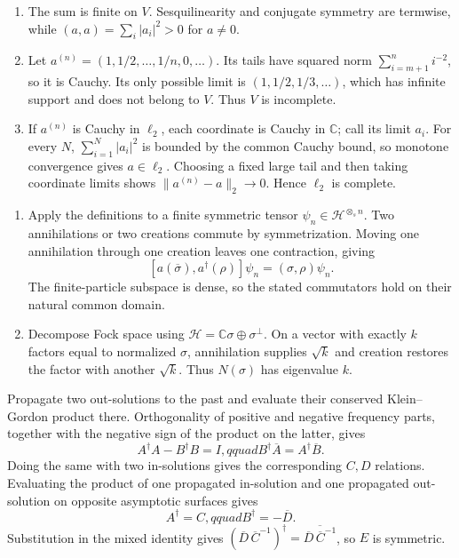 \ExerciseEditorialNote

\begin{enumerate}[leftmargin=2.8em,itemsep=1.2em]
\begin{enumerate}[label=\alph*),leftmargin=2em]
\item The sum is finite on \(V\).  Sesquilinearity and conjugate symmetry are
termwise, while \((a,a)=\sum_i|a_i|^2>0\) for \(a\ne0\).

\item Let \(a^{(n)}=(1,1/2,\ldots,1/n,0,\ldots)\).  Its tails have squared
norm \(\sum_{i=m+1}^n i^{-2}\), so it is Cauchy.  Its only possible limit is
\((1,1/2,1/3,\ldots)\), which has infinite support and does not belong to
\(V\).  Thus \(V\) is incomplete.

\item If \(a^{(n)}\) is Cauchy in \(\ell_2\), each coordinate is Cauchy in
\(\mathbb C\); call its limit \(a_i\).  For every \(N\),
\(\sum_{i=1}^N|a_i|^2\) is bounded by the common Cauchy bound, so monotone
convergence gives \(a\in\ell_2\).  Choosing a fixed large tail and then taking
coordinate limits shows \(\|a^{(n)}-a\|_2\to0\).  Hence \(\ell_2\) is complete.
\end{enumerate}

\begin{enumerate}[label=\alph*),leftmargin=2em]
\item Apply the definitions to a finite symmetric tensor
\(\psi_n\in\mathcal H^{\otimes_s n}\).  Two annihilations or two creations
commute by symmetrization.  Moving one annihilation through one creation leaves
one contraction, giving
\[
 [a(\overline\sigma),a^\dagger(\rho)]\psi_n
 =(\sigma,\rho)\psi_n.
\]
The finite-particle subspace is dense, so the stated commutators hold on their
natural common domain.

\item Decompose Fock space using
\(\mathcal H=\mathbb C\sigma\oplus\sigma^\perp\).  On a vector with exactly
\(k\) factors equal to normalized \(\sigma\), annihilation supplies
\(\sqrt{k}\) and creation restores the factor with another \(\sqrt{k}\).
Thus \(N(\sigma)\) has eigenvalue \(k\).
\end{enumerate}

Propagate two out-solutions to the past and evaluate their conserved
Klein--Gordon product there.  Orthogonality of positive and negative frequency
parts, together with the negative sign of the product on the latter, gives
\[
 A^\dagger A-B^\dagger B=I,qquad
 B^\dagger\overline A=A^\dagger\overline B.
\]
Doing the same with two in-solutions gives the corresponding \(C,D\) relations.
Evaluating the product of one propagated in-solution and one propagated
out-solution on opposite asymptotic surfaces gives
\[
 A^\dagger=C,qquad B^\dagger=-\overline D.
\]
Substitution in the mixed identity gives
\((\overline D\,\overline C^{-1})^\dagger=
\overline{\overline D\,\overline C^{-1}}\), so \(E\) is symmetric.


\end{enumerate}
